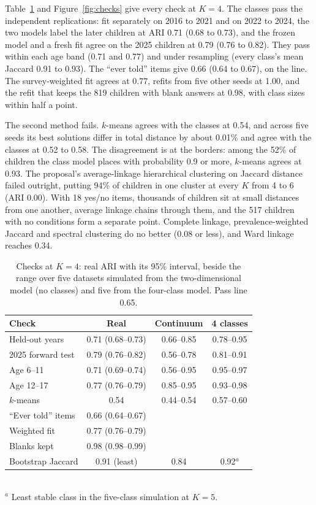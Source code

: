 Table~\ref{tab:checks} and Figure~\ref{fig:checks} give every check at $K=4$. The classes pass the independent replications: fit separately on 2016 to 2021 and on 2022 to 2024, the two models label the later children at ARI 0.71 (0.68 to 0.73), and the frozen model and a fresh fit agree on the 2025 children at 0.79 (0.76 to 0.82). They pass within each age band (0.71 and 0.77) and under resampling (every class's mean Jaccard 0.91 to 0.93). The ``ever told'' items give 0.66 (0.64 to 0.67), on the line. The survey-weighted fit agrees at 0.77, refits from five other seeds at 1.00, and the refit that keeps the 819 children with blank answers at 0.98, with class sizes within half a point.

The second method fails. $k$-means agrees with the classes at 0.54, and across five seeds its best solutions differ in total distance by about 0.01\% and agree with the classes at 0.52 to 0.58. The disagreement is at the borders: among the 52\% of children the class model places with probability 0.9 or more, $k$-means agrees at 0.93. The proposal's average-linkage hierarchical clustering on Jaccard distance failed outright, putting 94\% of children in one cluster at every $K$ from 4 to 6 (ARI 0.00). With 18 yes/no items, thousands of children sit at small distances from one another, average linkage chains through them, and the 517 children with no conditions form a separate point. Complete linkage, prevalence-weighted Jaccard and spectral clustering do no better (0.08 or less), and Ward linkage reaches 0.34.

\begin{table}[t]
\centering
\caption{Checks at $K=4$: real ARI with its 95\% interval, beside the range over five datasets simulated from the two-dimensional model (no classes) and five from the four-class model. Pass line 0.65.}
\label{tab:checks}
\small
\setlength{\tabcolsep}{3pt}
\begin{tabular}{lccc}
\toprule
Check & Real & Continuum & 4 classes \\
\midrule
Held-out years & 0.71 (0.68--0.73) & 0.66--0.85 & 0.78--0.95 \\
2025 forward test & 0.79 (0.76--0.82) & 0.56--0.78 & 0.81--0.91 \\
Age 6--11 & 0.71 (0.69--0.74) & 0.56--0.95 & 0.95--0.97 \\
Age 12--17 & 0.77 (0.76--0.79) & 0.85--0.95 & 0.93--0.98 \\
$k$-means & 0.54 & 0.44--0.54 & 0.57--0.60 \\
``Ever told'' items & 0.66 (0.64--0.67) & & \\
Weighted fit & 0.77 (0.76--0.79) & & \\
Blanks kept & 0.98 (0.98--0.99) & & \\
\midrule
Bootstrap Jaccard & 0.91 (least) & 0.84 & 0.92$^{a}$ \\
\bottomrule
\end{tabular}
\\[2pt]{\footnotesize $^{a}$ Least stable class in the five-class simulation at $K=5$.}
\end{table}

